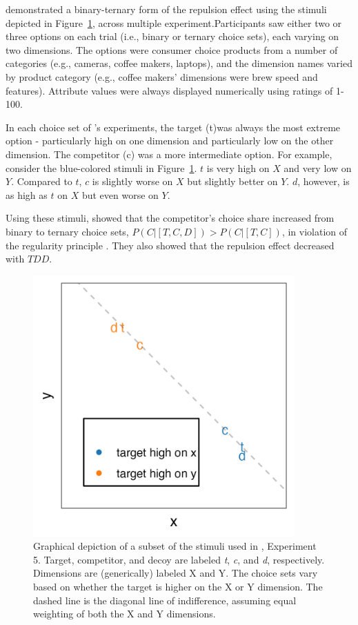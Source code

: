 \textcite{banerjeeFactorsThatPromote2024} demonstrated a binary-ternary form of the repulsion effect using the stimuli depicted in Figure~\ref{fig:banerjee_stim}, across multiple experiment.Participants saw either two or three options on each trial (i.e., binary or ternary choice sets), each varying on two dimensions. The options were consumer choice products from a number of categories (e.g., cameras, coffee makers, laptops), and the dimension names varied by product category (e.g., coffee makers' dimensions were brew speed and features). Attribute values were always displayed numerically using ratings of 1-100.

In each choice set of \textcite{banerjeeFactorsThatPromote2024}'s experiments, the target (t)was always the most extreme option - particularly high on one dimension and particularly low on the other dimension. The competitor (c) was a more intermediate option. For example, consider the blue-colored stimuli in Figure~\ref{fig:banerjee_stim}. $t$ is very high on $X$ and very low on $Y$. Compared to $t$, $c$ is slightly worse on $X$ but slightly better on $Y$. $d$, however, is as high as $t$ on $X$ but even worse on $Y$. 

Using these stimuli, \textcite{banerjeeFactorsThatPromote2024} showed that the competitor's choice share increased from binary to ternary choice sets, $P(C|[T,C,D])>P(C|[T,C])$, in violation of the regularity principle \parencite{marley1989random}. They also showed that the repulsion effect decreased with $TDD$.

\begin{figure}
    \includegraphics[width=100mm]{figures/banerjee_stim.jpeg}
    \caption{Graphical depiction of a subset of the stimuli used in \textcite{banerjeeFactorsThatPromote2024}, Experiment 5. Target, competitor, and decoy are labeled \textit{t}, \textit{c}, and \textit{d}, respectively. Dimensions are (generically) labeled X and Y. The choice sets vary based on whether the target is higher on the X or Y dimension. The dashed line is the diagonal line of indifference, assuming equal weighting of both the X and Y dimensions.}
    \label{fig:banerjee_stim}
\end{figure}

